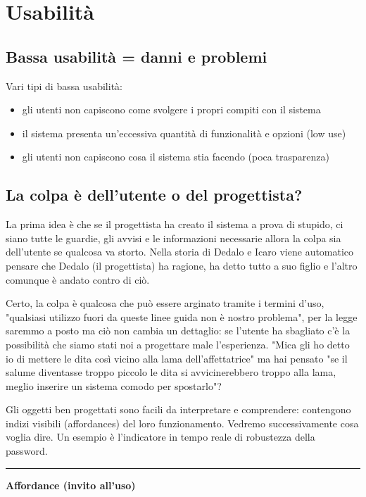 \documentclass[11pt,a4paper]{book}
\begin{document}
\section{Usabilità}
\subsection{Bassa usabilità = danni e problemi}
Vari tipi di bassa usabilità:
\begin{itemize}
	\item gli utenti non capiscono come svolgere i propri compiti con il sistema
	\item il sistema presenta un'eccessiva quantità di funzionalità e opzioni (low use)
	\item gli utenti non capiscono cosa il sistema stia facendo (poca trasparenza)
\end{itemize}

\subsection{La colpa è dell'utente o del progettista?}
La prima idea è che se il progettista ha creato il sistema a prova di stupido, ci siano tutte le guardie, gli avvisi e le informazioni necessarie allora la colpa sia dell'utente se qualcosa va storto. Nella storia di Dedalo e Icaro viene automatico pensare che Dedalo (il progettista) ha ragione, ha detto tutto a suo figlio e l'altro comunque è andato contro di ciò.

Certo, la colpa è qualcosa che può essere arginato tramite i termini d'uso, "qualsiasi utilizzo fuori da queste linee guida non è nostro problema", per la legge saremmo a posto ma ciò non cambia un dettaglio: se l'utente ha sbagliato c'è la possibilità che siamo stati noi a progettare male l'esperienza. "Mica gli ho detto io di mettere le dita così vicino alla lama dell'affettatrice" ma hai pensato "se il salume diventasse troppo piccolo le dita si avvicinerebbero troppo alla lama, meglio inserire un sistema comodo per spostarlo"?

Gli oggetti ben progettati sono facili da interpretare e comprendere: contengono indizi visibili (affordances) del loro funzionamento. Vedremo successivamente cosa voglia dire. Un esempio è l'indicatore in tempo reale di robustezza della password.

\noindent\rule{\textwidth}{1pt}
\begin{center}
	\textbf{Affordance (invito all’uso)}
\end{center}
\end{document}
